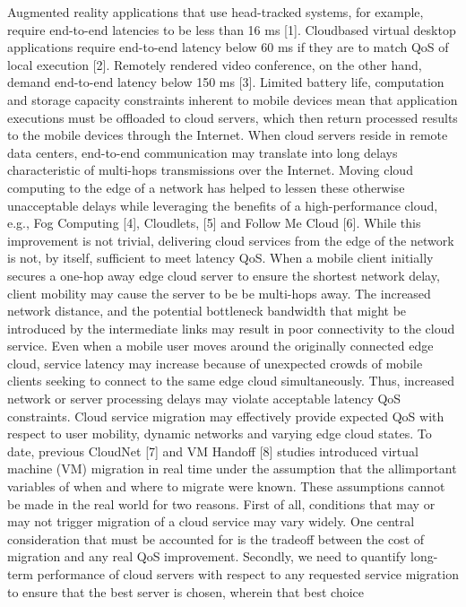 Augmented
reality applications that use head-tracked systems, for example,
require end-to-end latencies to be less than 16 ms [1]. Cloudbased
virtual desktop applications require end-to-end latency
below 60 ms if they are to match QoS of local execution [2].
Remotely rendered video conference, on the other hand,
demand end-to-end latency below 150 ms [3]. Limited battery
life, computation and storage capacity constraints inherent
to mobile devices mean that application executions must be
offloaded to cloud servers, which then return processed results
to the mobile devices through the Internet. When cloud servers
reside in remote data centers, end-to-end communication may
translate into long delays characteristic of multi-hops transmissions
over the Internet. Moving cloud computing to the edge of
a network has helped to lessen these otherwise unacceptable
delays while leveraging the benefits of a high-performance
cloud, e.g., Fog Computing [4], Cloudlets, [5] and Follow Me
Cloud [6]. While this improvement is not trivial, delivering
cloud services from the edge of the network is not, by itself,
sufficient to meet latency QoS. When a mobile client initially
secures a one-hop away edge cloud server to ensure the shortest
network delay, client mobility may cause the server to be
be multi-hops away. The increased network distance, and the
potential bottleneck bandwidth that might be introduced by the
intermediate links may result in poor connectivity to the cloud
service. Even when a mobile user moves around the originally
connected edge cloud, service latency may increase because of
unexpected crowds of mobile clients seeking to connect to the
same edge cloud simultaneously. Thus, increased network or
server processing delays may violate acceptable latency QoS
constraints.
Cloud service migration may effectively provide expected
QoS with respect to user mobility, dynamic networks and
varying edge cloud states. To date, previous CloudNet [7]
and VM Handoff [8] studies introduced virtual machine (VM)
migration in real time under the assumption that the allimportant
variables of when and where to migrate were known.
These assumptions cannot be made in the real world for
two reasons. First of all, conditions that may or may not
trigger migration of a cloud service may vary widely. One
central consideration that must be accounted for is the tradeoff
between the cost of migration and any real QoS improvement.
Secondly, we need to quantify long-term performance of cloud
servers with respect to any requested service migration to
ensure that the best server is chosen, wherein that best choice
